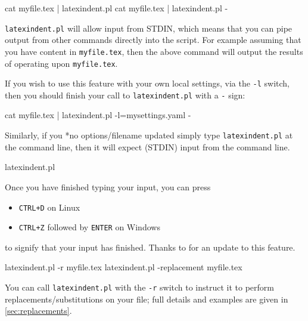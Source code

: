  \begin{commandshell}
cat myfile.tex | latexindent.pl
cat myfile.tex | latexindent.pl -
\end{commandshell}

 \texttt{latexindent.pl} will%
  allow input from STDIN, which means that you can
 pipe output from other commands directly into the script. For example assuming that you
 have content in \texttt{myfile.tex}, then the above command will output the results of
 operating upon \texttt{myfile.tex}.

 If you wish to use this feature with your own local settings, via the \texttt{-l}
 switch, then you should finish your call to \texttt{latexindent.pl} with a \texttt{-}
 sign:

 \begin{commandshell}
cat myfile.tex | latexindent.pl -l=mysettings.yaml -
\end{commandshell}

 Similarly, if you *{no options/filename updated} simply type
 \texttt{latexindent.pl} at the command line, then it will expect (STDIN) input from the
 command line.%

 \begin{commandshell}
latexindent.pl
\end{commandshell}

 Once you have finished typing your input, you can press
 \begin{itemize}
  \item \texttt{CTRL+D} on Linux
  \item \texttt{CTRL+Z} followed by \texttt{ENTER} on Windows
 \end{itemize}
 to signify that your input has finished. Thanks to \cite{xu-cheng} for an update to this
 feature.  

 \begin{commandshell}
latexindent.pl -r myfile.tex
latexindent.pl -replacement myfile.tex
\end{commandshell}

 You can  call \texttt{latexindent.pl} with
 the \texttt{-r} switch to instruct it to perform replacements/substitutions on your
 file; full details and examples are given in \vref{sec:replacements}.


